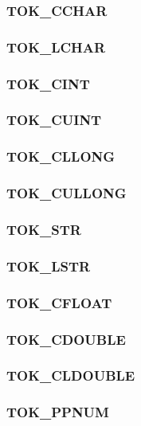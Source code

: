 \subsubsection{TOK\_CCHAR}
\subsubsection{TOK\_LCHAR}
\subsubsection{TOK\_CINT}
\subsubsection{TOK\_CUINT}
\subsubsection{TOK\_CLLONG}
\subsubsection{TOK\_CULLONG}
\subsubsection{TOK\_STR}
\subsubsection{TOK\_LSTR}
\subsubsection{TOK\_CFLOAT}
\subsubsection{TOK\_CDOUBLE}
\subsubsection{TOK\_CLDOUBLE}
\subsubsection{TOK\_PPNUM}



